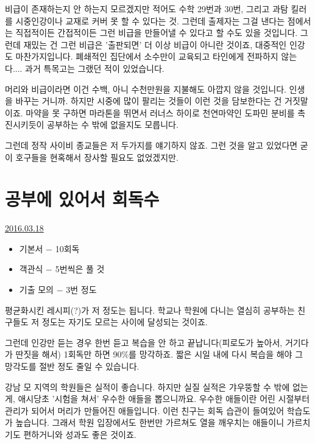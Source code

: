 비급이 존재하는지 안 하는지 모르겠지만 적어도 수학 29번과 30번, 그리고 과탐 킬러를 시중인강이나 교재로 커버 못 할 수 있다는 것.
그런데 출제자는 그걸 낸다는 점에서는 직접적이든 간접적이든 그런 비급을 만들어낼 수 있다고 할 수도 있을 것입니다.
그런데 재밌는 건 그런 비급은 '출판되면' 더 이상 비급이 아니란 것이죠, 대중적인 인강도 마찬가지입니다.
폐쇄적인 집단에서 소수만이 교육되고 타인에게 전파하지 않는다.... 과거 특목고는 그랬던 적이 있었습니다.
\vspace{5mm}

머리와 비급이라면 이건 수백, 아니 수천만원을 지불해도 아깝지 않을 것입니다. 인생을 바꾸는 거니까.
하지만 시중에 많이 팔리는 것들이 이런 것을 담보한다는 건 거짓말이죠.
마약을 못 구하면 마라톤을 뛰면서 러너스 하이로 천연마약인 도파민 분비를 촉진시키듯이 공부하는 수 밖에 없을지도 모릅니다.
\vspace{5mm}

그런데 정작 사이비 종교들은 저 두가지를 얘기하지 않죠.
그런 것을 알고 있었다면 굳이 호구들을 현혹해서 장사할 필요도 없었겠지만.
\vspace{5mm}







\section{공부에 있어서 회독수}
\href{https://www.kockoc.com/Apoc/682149}{2016.03.18}

\vspace{5mm}
\begin{itemize}
    \item 기본서 $-$ 10회독
    \item 객관식 $-$ 5번씩은 풀 것
    \item 기출 모의 $-$ 3번 정도
\end{itemize}
\vspace{5mm}

평균화시킨 레시피(?)가 저 정도는 됩니다.
학교나 학원에 다니는 열심히 공부하는 친구들도 저 정도는 자기도 모르는 사이에 달성되는 것이죠.
\vspace{5mm}

그런데 인강만 듣는 경우 한번 듣고 복습을 안 하고 끝납니다(피로도가 높아서, 거기다가 딴짓을 해서)
1회독만 하면 90$\%$를 망각하죠. 짧은 시일 내에 다시 복습을 해야 그 망각도를 절반 정도 줄일 수 있습니다.
\vspace{5mm}

강남 모 지역의 학원들은 실적이 좋습니다. 하지만 실질 실적은 갸우뚱할 수 밖에 없는 게, 애시당초  '시험을 쳐서' 우수한 애들을 뽑으니까요.
우수한 애들이란 어린 시절부터 관리가 되어서 머리가 만들어진 애들입니다. 이런 친구는 회독 습관이 들여있어 학습도가 높습니다.
그래서 학원 입장에서도 한번만 가르쳐도 열을 깨우치는 애들이니 가르치기도 편하거니와 성과도 좋은 것이죠.
\vspace{5mm}

